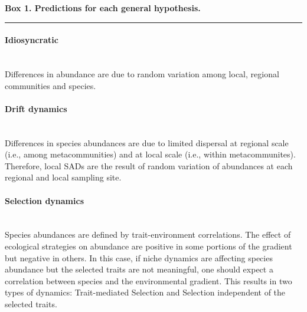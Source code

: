 \documentclass[12pt]{article}
\begin{document}
\begin{mdframed}[style=exampledefault]
\newpage
\begin{singlespacing}
 \textbf{Box 1. Predictions for each general hypothesis.} \\
 \noindent\rule[0.5ex]{\linewidth}{1pt}
  \paragraph{{\color{grey}{$\blacksquare$}} Idiosyncratic} ~\\ Differences in abundance are due to random variation among local, regional communities and species.
\paragraph{{\color{neutral}{$\blacksquare$}} Drift dynamics} ~\\ Differences in species abundances are due to limited dispersal at regional scale (i.e., among metacommunities) and at local scale (i.e., within metacommunites). Therefore, local SADs are the result of random variation of abundances at each regional and local sampling site. %
\paragraph{{\color{niche}{$\blacksquare$}} Selection dynamics } ~\\ Species abundances are defined by trait-environment correlations. The effect of ecological strategies on abundance are positive in some portions of the gradient but negative in others. In this case, if niche dynamics are affecting species abundance but the selected traits are not meaningful, one should expect a correlation between species and the environmental gradient. This results in two types of dynamics: Trait-mediated Selection and Selection independent of the selected traits.  

\end{singlespacing}
\end{mdframed}
\end{document}
